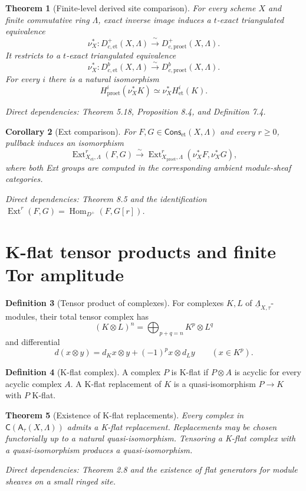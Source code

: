 \documentclass[10pt]{article}
\newtheorem{theorem}{Theorem}[section]
\newtheorem{corollary}[theorem]{Corollary}
\theoremstyle{definition}
\newtheorem{definition}[theorem]{Definition}
\newcommand{\Lam}{\Lambda}
\newcommand{\Cpx}{\mathsf{C}}
\newcommand{\Cons}{\mathsf{Cons}}
\newcommand{\et}{\mathrm{et}}
\newcommand{\proet}{\mathrm{proet}}
\newcommand{\DbcAt}[1]{D^b_{c,#1}}
\newcommand{\Hom}{\operatorname{Hom}}
\newcommand{\dep}[1]{\par\smallskip\noindent\textit{Direct dependencies: #1}}
\begin{document}
\begin{theorem}[Finite-level derived site comparison]
For every scheme $X$ and finite commutative ring $\Lam$, exact inverse image
induces a $t$-exact triangulated equivalence
\[
\nu_X^*:D^+_{c,\et}(X,\Lam)
\xrightarrow{\ \sim\ }D^+_{c,\proet}(X,\Lam).
\]
It restricts to a $t$-exact triangulated equivalence
\[
\nu_X^*: \DbcAt{\et}(X,\Lam)
\xrightarrow{\ \sim\ }\DbcAt{\proet}(X,\Lam).
\]
For every $i$ there is a natural isomorphism
\[
H^i_\proet(\nu_X^*K)\simeq\nu_X^*H^i_\et(K).
\]
\dep{Theorem 5.18, Proposition 8.4, and Definition 7.4.}
\end{theorem}

\begin{corollary}[Ext comparison]
For $F,G\in\Cons_\et(X,\Lam)$ and every $r\ge0$, pullback induces an
isomorphism
\[
\operatorname{Ext}^r_{X_\et,\Lam}(F,G)
\xrightarrow{\sim}
\operatorname{Ext}^r_{X_\proet,\Lam}(\nu_X^*F,\nu_X^*G),
\]
where both Ext groups are computed in the corresponding ambient module-sheaf
categories.
\dep{Theorem 8.5 and the identification
$\operatorname{Ext}^r(F,G)=\Hom_{D^+}(F,G[r])$.}
\end{corollary}

\section{K-flat tensor products and finite Tor amplitude}

\begin{definition}[Tensor product of complexes]
For complexes $K,L$ of $\underline\Lam_{X,\tau}$-modules, their total tensor
complex has
\[
(K\otimes L)^n=\bigoplus_{p+q=n}K^p\otimes L^q
\]
and differential
\[
d(x\otimes y)=d_Kx\otimes y+(-1)^p x\otimes d_Ly
\qquad(x\in K^p).
\]
\end{definition}

\begin{definition}[K-flat complex]
A complex $P$ is K-flat if $P\otimes A$ is acyclic for every acyclic complex
$A$.  A K-flat replacement of $K$ is a quasi-isomorphism $P\to K$ with $P$
K-flat.
\end{definition}

\begin{theorem}[Existence of K-flat replacements]
Every complex in $\Cpx(\mathsf A_\tau(X,\Lam))$ admits a K-flat replacement.
Replacements may be chosen functorially up to a natural quasi-isomorphism.
Tensoring a K-flat complex with a quasi-isomorphism produces a
quasi-isomorphism.
\dep{Theorem 2.8 and the existence of flat generators for module sheaves on a
small ringed site.}
\end{theorem}
\end{document}
